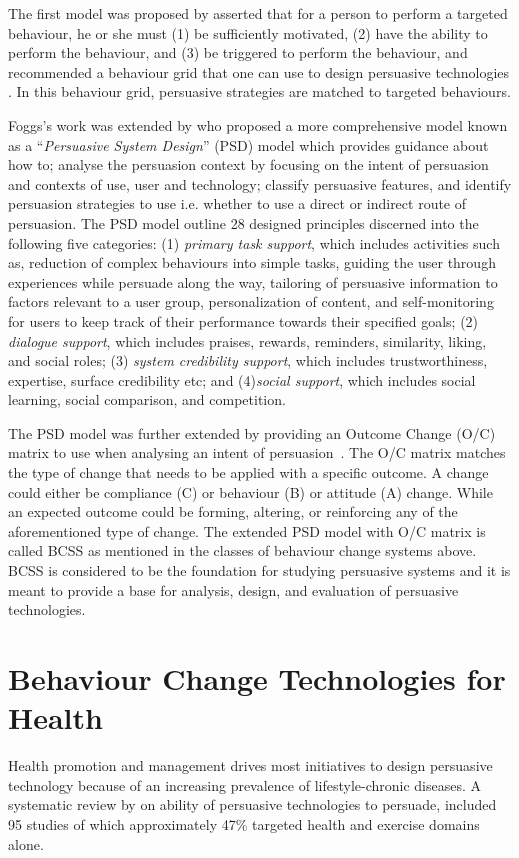 The first model was proposed by \cite{fogg2009behavior} asserted that for a person to perform a targeted behaviour, he or she must (1) be sufficiently motivated, (2) have the ability to perform the behaviour, and (3) be triggered to perform the behaviour, and recommended a behaviour grid that one can use to design persuasive technologies \citep{fogg2009behavior2}. In this behaviour grid, persuasive strategies are matched  to targeted behaviours. 

Foggs's work was extended by \cite{Oinas-kukkonen:psd} who proposed a more comprehensive model known as a ``\emph{Persuasive System Design}'' (PSD) model which provides guidance about how to; analyse the persuasion context by focusing on the intent of persuasion and contexts of use, user and technology; classify persuasive features, and identify persuasion strategies to use i.e. whether to use a direct or indirect route of persuasion. The PSD model outline 28 designed principles discerned into the following five categories: (1) \emph{primary task support}, which includes activities such as, reduction of complex behaviours into simple tasks, guiding the user through experiences while persuade along the way, tailoring of persuasive information to factors relevant to a user group, personalization of content, and self-monitoring for users to keep track of their performance towards their specified goals; (2) \emph{dialogue support}, which includes praises, rewards, reminders, similarity, liking, and social roles; (3) \emph{system credibility support}, which includes trustworthiness, expertise, surface credibility etc; and (4)\emph{social support}, which includes social learning, social comparison, and competition.

The PSD model was further extended by providing an Outcome Change (O/C) matrix to use when analysing an intent of persuasion~\citep{Oinas-Kukkonen:foundation}. The O/C matrix matches the type of change that needs to be applied with a specific outcome. A change could either be compliance (C) or behaviour (B) or attitude (A) change. While an expected outcome could be forming, altering, or reinforcing any of the aforementioned type of change. The extended PSD model with O/C matrix is called BCSS as mentioned in the classes of behaviour change systems above. BCSS is considered to be the foundation for studying persuasive systems and it is meant to provide a base for analysis, design, and evaluation of persuasive technologies.   

\section{Behaviour Change Technologies for Health}
Health promotion and management drives most initiatives to design persuasive technology because of an increasing prevalence of lifestyle-chronic diseases. A systematic review by \cite{hamari2014persuasive} on ability of persuasive technologies to persuade, included 95 studies of which approximately 47\% targeted health and exercise domains alone.

